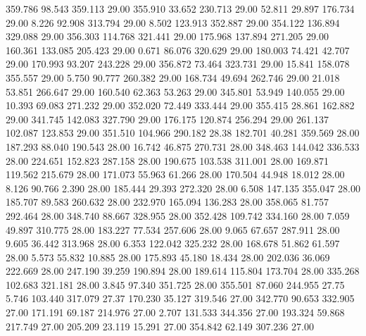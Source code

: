  359.786   98.543  359.113        29.00
 355.910   33.652  230.713        29.00
  52.811   29.897  176.734        29.00
   8.226   92.908  313.794        29.00
   8.502  123.913  352.887        29.00
 354.122  136.894  329.088        29.00
 356.303  114.768  321.441        29.00
 175.968  137.894  271.205        29.00
 160.361  133.085  205.423        29.00
   0.671   86.076  320.629        29.00
 180.003   74.421   42.707        29.00
 170.993   93.207  243.228        29.00
 356.872   73.464  323.731        29.00
  15.841  158.078  355.557        29.00
   5.750   90.777  260.382        29.00
 168.734   49.694  262.746        29.00
  21.018   53.851  266.647        29.00
 160.540   62.363   53.263        29.00
 345.801   53.949  140.055        29.00
  10.393   69.083  271.232        29.00
 352.020   72.449  333.444        29.00
 355.415   28.861  162.882        29.00
 341.745  142.083  327.790        29.00
 176.175  120.874  256.294        29.00
 261.137  102.087  123.853        29.00
 351.510  104.966  290.182        28.38
 182.701   40.281  359.569        28.00
 187.293   88.040  190.543        28.00
  16.742   46.875  270.731        28.00
 348.463  144.042  336.533        28.00
 224.651  152.823  287.158        28.00
 190.675  103.538  311.001        28.00
 169.871  119.562  215.679        28.00
 171.073   55.963   61.266        28.00
 170.504   44.948   18.012        28.00
   8.126   90.766    2.390        28.00
 185.444   29.393  272.320        28.00
   6.508  147.135  355.047        28.00
 185.707   89.583  260.632        28.00
 232.970  165.094  136.283        28.00
 358.065   81.757  292.464        28.00
 348.740   88.667  328.955        28.00
 352.428  109.742  334.160        28.00
   7.059   49.897  310.775        28.00
 183.227   77.534  257.606        28.00
   9.065   67.657  287.911        28.00
   9.605   36.442  313.968        28.00
   6.353  122.042  325.232        28.00
 168.678   51.862   61.597        28.00
   5.573   55.832   10.885        28.00
 175.893   45.180   18.434        28.00
 202.036   36.069  222.669        28.00
 247.190   39.259  190.894        28.00
 189.614  115.804  173.704        28.00
 335.268  102.683  321.181        28.00
   3.845   97.340  351.725        28.00
 355.501   87.060  244.955        27.75
   5.746  103.440  317.079        27.37
 170.230   35.127  319.546        27.00
 342.770   90.653  332.905        27.00
 171.191   69.187  214.976        27.00
   2.707  131.533  344.356        27.00
 193.324   59.868  217.749        27.00
 205.209   23.119   15.291        27.00
 354.842   62.149  307.236        27.00
